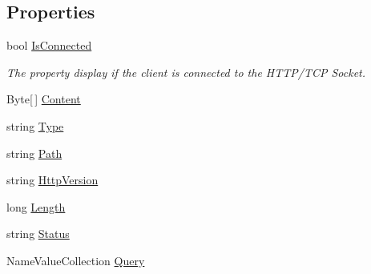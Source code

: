 \subsection*{Properties}
\begin{DoxyCompactItemize}
\item 
bool \hyperlink{class_damp_server_1_1_http_a90728ed8b720d4a1e4988aab6966def0}{Is\-Connected}
\begin{DoxyCompactList}\small\item\em The property display if the client is connected to the H\-T\-T\-P/\-T\-C\-P Socket. \end{DoxyCompactList}\item 
Byte\mbox{[}$\,$\mbox{]} \hyperlink{class_damp_server_1_1_http_a5eff225d340daeda680441cd92718235}{Content}
\item 
string \hyperlink{class_damp_server_1_1_http_a2534b03e83104042dc674a4c397f85ad}{Type}
\item 
string \hyperlink{class_damp_server_1_1_http_aae780a80b09ab272dd3f81a3c71f1424}{Path}
\item 
string \hyperlink{class_damp_server_1_1_http_a596e999fb442757b904fdddb597029f7}{Http\-Version}
\item 
long \hyperlink{class_damp_server_1_1_http_a3a8f75a3664306404d8c8d174e987832}{Length}
\item 
string \hyperlink{class_damp_server_1_1_http_a9a9b29df4c279c6a1adb5f0de32977e7}{Status}
\item 
Name\-Value\-Collection \hyperlink{class_damp_server_1_1_http_a1e9e9e3e91c917658aaa831190cac5b0}{Query}
\end{DoxyCompactItemize}
